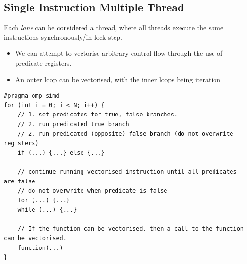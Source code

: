 \subsection{Single Instruction Multiple Thread}
Each \textit{lane} can be considered a thread, where all threads execute the same instructions synchronously/in lock-step.
\begin{itemize}
	\item We can attempt to vectorise arbitrary control flow through the use of predicate registers.
	\item An outer loop can be vectorised, with the inner loops being iteration
\end{itemize}
\begin{verbatim}
#pragma omp simd
for (int i = 0; i < N; i++) {
    // 1. set predicates for true, false branches.
    // 2. run predicated true branch
    // 2. run predicated (opposite) false branch (do not overwrite registers)
    if (...) {...} else {...}

    // continue running vectorised instruction until all predicates are false
    // do not overwrite when predicate is false
    for (...) {...}
    while (...) {...}

    // If the function can be vectorised, then a call to the function can be vectorised.
    function(...)
}
\end{verbatim}


